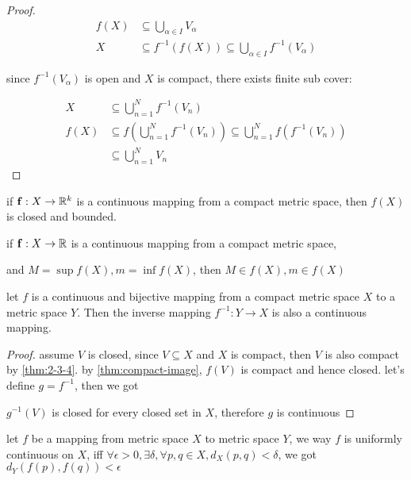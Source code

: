 \begin{proof}
    \begin{align*}
        f(X) &\subseteq \bigcup_{\alpha \in I}V_{\alpha} \\
        X & \subseteq f^{-1}(f(X)) \subseteq \bigcup_{\alpha \in I}f^{-1}(V_{\alpha})
    \end{align*}

    since $f^{-1}(V_{\alpha})$ is open and $X$ is compact, there exists finite sub cover:

    \begin{align*}
        X  &\subseteq \bigcup_{n=1}^{N}f^{-1}(V_{n}) \\
        f(X) &\subseteq f(\bigcup_{n=1}^{N}f^{-1}(V_{n})) \subseteq \bigcup_{n=1}^{N}f(f^{-1}(V_{n})) \\
        & \subseteq \bigcup_{n=1}^{N}V_{n}
    \end{align*}
\end{proof}

\begin{corollary}
    if $\mathbf{f}: X \to \mathbb{R}^k$ is a continuous mapping from a compact metric space, 
    then $f(X)$ is closed and bounded.
\end{corollary}

\begin{corollary}
    if $\mathbf{f}: X \to \mathbb{R}$ is a continuous mapping from a compact metric space, 

    and $M = \sup f(X), m = \inf f(X)$,  then $M \in f(X), m \in f(X)$
\end{corollary}

\begin{thm}
    let $f$ is a continuous and bijective mapping from a compact metric space $X$ 
    to a metric space $Y$. Then the inverse mapping $f^{-1}: Y \to X$ is also a continuous mapping.
\end{thm}

\begin{proof}
    assume $V$ is closed, since $V \subseteq X$ and $X$ is compact, then $V$ is also compact by \autoref{thm:2-3-4}.
    by \autoref{thm:compact-image}, $f(V)$ is compact and hence closed. let's define $g = f^{-1}$, then we got

    $g^{-1}(V)$ is closed for every closed set in $X$, therefore $g$ is continuous
\end{proof}


\begin{definition}
    let $f$ be a mapping from metric space $X$ to metric space $Y$, we way $f$ is uniformly continuous on $X$,
    iff $\forall \epsilon > 0, \exists \delta, \forall p,q \in X, d_X(p,q) < \delta$, we got $d_Y(f(p),f(q)) < \epsilon$
\end{definition}


